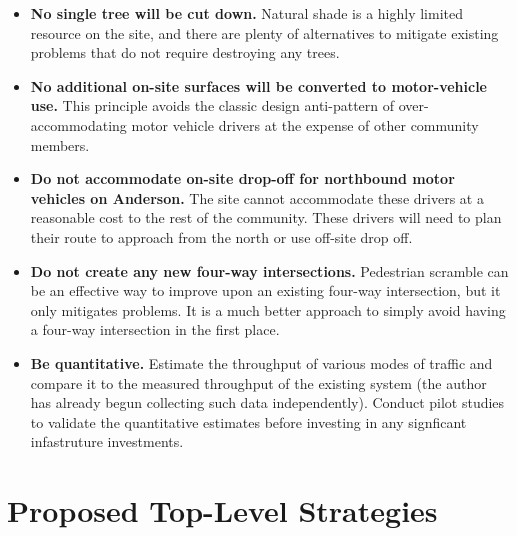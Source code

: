 \documentclass[12pt]{article}
\begin{document}
\begin{itemize}

\item {\bf No single tree will be cut down.}  Natural shade is a highly
  limited resource on the site, and there are plenty of alternatives
  to mitigate existing problems that do not require destroying any
  trees.

\item {\bf No additional on-site surfaces will be converted to
  motor-vehicle use.}  This principle avoids the classic design
  anti-pattern of over-accommodating motor vehicle drivers at the
  expense of other community members.

\item {\bf Do not accommodate on-site drop-off for northbound motor
  vehicles on Anderson.}  The site cannot accommodate these drivers at
  a reasonable cost to the rest of the community.  These drivers will
  need to plan their route to approach from the north or
  use off-site drop off.

\item {\bf Do not create any new four-way intersections.}  Pedestrian
  scramble can be an effective way to improve upon an existing
  four-way intersection, but it only mitigates problems. It is a much
  better approach to simply avoid having a four-way intersection in
  the first place.

\item {\bf Be quantitative.}  Estimate the throughput of various modes of
  traffic and compare it to the measured throughput of the existing
  system (the author has already begun collecting such data
  independently).  Conduct pilot studies to validate the quantitative
  estimates before investing in any signficant infastruture
  investments.
  
\end{itemize}

\section{Proposed Top-Level Strategies}
\end{document}
